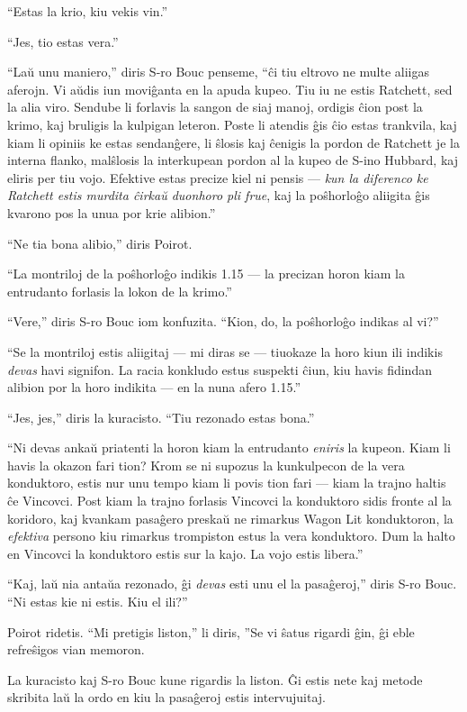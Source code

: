 ``Estas la krio, kiu vekis vin.''

``Jes, tio estas vera.''

``Laŭ unu maniero,'' diris S-ro Bouc penseme, ``ĉi tiu eltrovo ne multe aliigas aferojn. Vi aŭdis iun moviĝanta en la apuda kupeo. Tiu iu ne estis Ratchett, sed la alia viro. Sendube li forlavis la sangon de siaj manoj, ordigis ĉion post la krimo, kaj bruligis la kulpigan leteron. Poste li atendis ĝis ĉio estas trankvila, kaj kiam li opiniis ke estas sendanĝere, li ŝlosis kaj ĉenigis la pordon de Ratchett je la interna flanko, malŝlosis la interkupean pordon al la kupeo de S-ino Hubbard, kaj eliris per tiu vojo. Efektive estas precize kiel ni pensis --- \emph{kun la diferenco ke Ratchett estis murdita ĉirkaŭ duonhoro pli frue}, kaj la poŝhorloĝo aliigita ĝis kvarono pos la unua por krie alibion.''

``Ne tia bona alibio,'' diris Poirot.

``La montriloj de la poŝhorloĝo indikis 1.15 --- la precizan horon kiam la entrudanto forlasis la lokon de la krimo.''

``Vere,'' diris S-ro Bouc iom konfuzita. ``Kion, do, la poŝhorloĝo indikas al vi?''

``Se la montriloj estis aliigitaj --- mi diras se --- tiuokaze la horo kiun ili indikis \emph{devas} havi signifon. La racia konkludo estus suspekti ĉiun, kiu havis fidindan alibion por la horo indikita --- en la nuna afero 1.15.''

``Jes, jes,'' diris la kuracisto. ``Tiu rezonado estas bona.''

``Ni devas ankaŭ priatenti la horon kiam la entrudanto \emph{eniris} la kupeon. Kiam li havis la okazon fari tion? Krom se ni supozus la kunkulpecon de la vera konduktoro, estis nur unu tempo kiam li povis tion fari --- kiam la trajno haltis ĉe Vincovci. Post kiam la trajno forlasis Vincovci la konduktoro sidis fronte al la koridoro, kaj kvankam pasaĝero preskaŭ ne rimarkus Wagon Lit konduktoron, la \emph{efektiva} persono kiu rimarkus trompiston estus la vera konduktoro. Dum la halto en Vincovci la konduktoro estis sur la kajo. La vojo estis libera.''

``Kaj, laŭ nia antaŭa rezonado, ĝi \emph{devas} esti unu el la pasaĝeroj,'' diris S-ro Bouc. ``Ni estas kie ni estis. Kiu el ili?''

Poirot ridetis. ``Mi pretigis liston,'' li diris, ''Se vi ŝatus rigardi ĝin, ĝi eble refreŝigos vian memoron.

La kuracisto kaj S-ro Bouc kune rigardis la liston. Ĝi estis nete kaj metode skribita laŭ la ordo en kiu la pasaĝeroj estis intervujuitaj.

